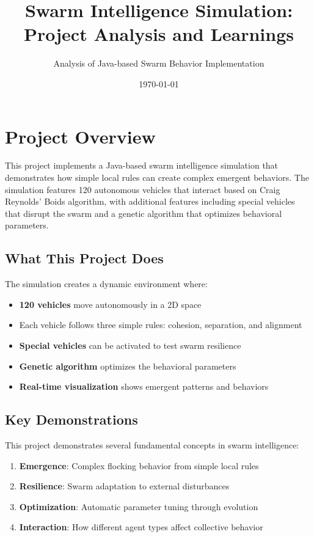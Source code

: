 \documentclass[12pt,a4paper]{article}
\title{Swarm Intelligence Simulation: Project Analysis and Learnings}
\author{Analysis of Java-based Swarm Behavior Implementation}
\date{\today}
\begin{document}
\maketitle

\tableofcontents
\newpage

\section{Project Overview}

This project implements a Java-based swarm intelligence simulation that demonstrates how simple local rules can create complex emergent behaviors. The simulation features 120 autonomous vehicles that interact based on Craig Reynolds' Boids algorithm, with additional features including special vehicles that disrupt the swarm and a genetic algorithm that optimizes behavioral parameters.

\subsection{What This Project Does}

The simulation creates a dynamic environment where:
\begin{itemize}
    \item \textbf{120 vehicles} move autonomously in a 2D space
    \item Each vehicle follows three simple rules: cohesion, separation, and alignment
    \item \textbf{Special vehicles} can be activated to test swarm resilience
    \item \textbf{Genetic algorithm} optimizes the behavioral parameters
    \item \textbf{Real-time visualization} shows emergent patterns and behaviors
\end{itemize}

\subsection{Key Demonstrations}

This project demonstrates several fundamental concepts in swarm intelligence:

\begin{enumerate}
    \item \textbf{Emergence}: Complex flocking behavior from simple local rules
    \item \textbf{Resilience}: Swarm adaptation to external disturbances
    \item \textbf{Optimization}: Automatic parameter tuning through evolution
    \item \textbf{Interaction}: How different agent types affect collective behavior
\end{enumerate}
\end{document}
